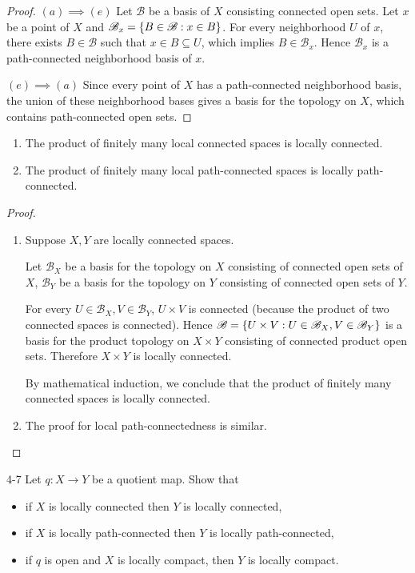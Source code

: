 \begin{proof}
	$(a)\implies (e)$ Let $\mathscr{B}$ be a basis of $X$ consisting connected open sets. Let $x$ be a point of $X$ and $\mathscr{B}_{x} = \left\{{ B\in\mathscr{B}: x\in B }\right\}$. For every neighborhood $U$ of $x$, there exists $B\in\mathscr{B}$ such that $x\in B\subseteq U$, which implies $B\in \mathscr{B}_{x}$. Hence $\mathscr{B}_{x}$ is a path-connected neighborhood basis of $x$.

	$(e)\implies (a)$ Since every point of $X$ has a path-connected neighborhood basis, the union of these neighborhood bases gives a basis for the topology on $X$, which contains path-connected open sets.
\end{proof}

\begin{note}
	\begin{enumerate}[label={(\alph*)}]
		\item The product of finitely many local connected spaces is locally connected.
		\item The product of finitely many local path-connected spaces is locally path-connected.
	\end{enumerate}
\end{note}

\begin{proof}
	\begin{enumerate}[label={(\alph*)}]
		\item Suppose $X, Y$ are locally connected spaces.

		      Let $\mathscr{B}_{X}$ be a basis for the topology on $X$ consisting of connected open sets of $X$, $\mathscr{B}_{Y}$ be a basis for the topology on $Y$ consisting of connected open sets of $Y$.

		      For every $U\in \mathscr{B}_{X}, V\in \mathscr{B}_{Y}$, $U\times V$ is connected (because the product of two connected spaces is connected). Hence $\mathscr{B} = \left\{{ U\times V : U\in \mathscr{B}_{X}, V\in \mathscr{B}_{Y} }\right\}$ is a basis for the product topology on $X\times Y$ consisting of connected product open sets. Therefore $X\times Y$ is locally connected.

		      By mathematical induction, we conclude that the product of finitely many connected spaces is locally connected.
		\item The proof for local path-connectedness is similar.
	\end{enumerate}
\end{proof}

\begin{problem}{4-7}\label{problem:4-7}
Let $q: X\to Y$ be a quotient map. Show that
\begin{itemize}
	\item if $X$ is locally connected then $Y$ is locally connected,
	\item if $X$ is locally path-connected then $Y$ is locally path-connected,
	\item if $q$ is open and $X$ is locally compact, then $Y$ is locally compact.
\end{itemize}
\end{problem}


